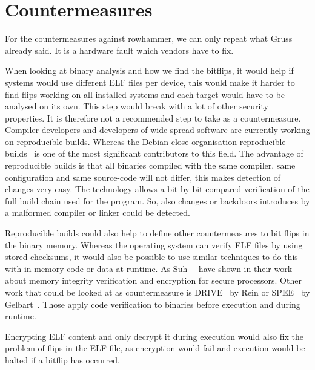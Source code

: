 \chapter{Countermeasures}\label{sec:countermeasure}

For the countermeasures against rowhammer, we can only repeat what
Gruss~\etal~\cite{nethammer, flipinthewall} already said. It is a hardware fault
which vendors have to fix.

When looking at binary analysis and how we find the bitflips, it would help if
systems would use different ELF files per device, this would make it harder to
find flips working on all installed systems and each target would have to be
analysed on its own. This step would break with a lot of other security
properties. It is therefore not a recommended step to take as a countermeasure.
Compiler developers and developers of wide-spread software are currently working
on reproducible builds. Whereas the Debian close organisation
reproducible-builds~\cite{reprobuilds} is one of the most significant
contributors to this field. The advantage of reproducible builds is that all
binaries compiled with the same compiler, same configuration and same
source-code will not differ, this makes detection of changes very easy. The
technology allows a bit-by-bit compared verification of the full build chain
used for the program. So, also changes or backdoors introduces by a malformed
compiler or linker could be detected.

Reproducible builds could also help to define other countermeasures to bit flips
in the binary memory. Whereas the operating system can verify ELF files by using
stored checksums, it would also be possible to use similar techniques to do this
with in-memory code or data at runtime. As Suh~\etal~\cite{memintegrity} have
shown in their work about memory integrity verification and encryption for
secure processors. Other work that could be looked at as countermeasure is
DRIVE~\cite{drive} by Rein or SPEE~\cite{spee} by Gelbart~\etal. Those apply
code verification to binaries before execution and during runtime.

Encrypting ELF content and only decrypt it during execution would also fix the
problem of flips in the ELF file, as encryption would fail and execution would
be halted if a bitflip has occurred.

